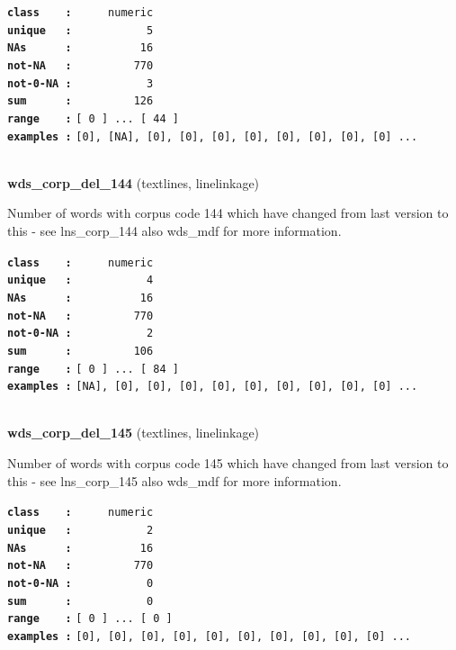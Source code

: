 \documentclass[]{article}
\begin{document}
\textbf{\texttt{class\ \ \ \ :}} \texttt{~~~~~numeric}\\
\textbf{\texttt{unique\ \ \ :}} \texttt{~~~~~~~~~~~5}\\
\textbf{\texttt{NAs\ \ \ \ \ \ :}} \texttt{~~~~~~~~~~16}\\
\textbf{\texttt{not-NA\ \ \ :}} \texttt{~~~~~~~~~770}\\
\textbf{\texttt{not-0-NA\ :}} \texttt{~~~~~~~~~~~3}\\
\textbf{\texttt{sum\ \ \ \ \ \ :}} \texttt{~~~~~~~~~126}\\
\textbf{\texttt{range\ \ \ \ :}}
\texttt{{[}\ 0\ {]}\ ...\ {[}\ 44\ {]}}\\
\textbf{\texttt{examples\ :}}
\texttt{{[}0{]},\ {[}NA{]},\ {[}0{]},\ {[}0{]},\ {[}0{]},\ {[}0{]},\ {[}0{]},\ {[}0{]},\ {[}0{]},\ {[}0{]}\ ...}\\

~

\textbf{wds\_corp\_del\_144} (textlines, linelinkage)

Number of words with corpus code 144 which have changed from last
version to this - see lns\_corp\_144 also wds\_mdf for more information.

\textbf{\texttt{class\ \ \ \ :}} \texttt{~~~~~numeric}\\
\textbf{\texttt{unique\ \ \ :}} \texttt{~~~~~~~~~~~4}\\
\textbf{\texttt{NAs\ \ \ \ \ \ :}} \texttt{~~~~~~~~~~16}\\
\textbf{\texttt{not-NA\ \ \ :}} \texttt{~~~~~~~~~770}\\
\textbf{\texttt{not-0-NA\ :}} \texttt{~~~~~~~~~~~2}\\
\textbf{\texttt{sum\ \ \ \ \ \ :}} \texttt{~~~~~~~~~106}\\
\textbf{\texttt{range\ \ \ \ :}}
\texttt{{[}\ 0\ {]}\ ...\ {[}\ 84\ {]}}\\
\textbf{\texttt{examples\ :}}
\texttt{{[}NA{]},\ {[}0{]},\ {[}0{]},\ {[}0{]},\ {[}0{]},\ {[}0{]},\ {[}0{]},\ {[}0{]},\ {[}0{]},\ {[}0{]}\ ...}\\

~

\textbf{wds\_corp\_del\_145} (textlines, linelinkage)

Number of words with corpus code 145 which have changed from last
version to this - see lns\_corp\_145 also wds\_mdf for more information.

\textbf{\texttt{class\ \ \ \ :}} \texttt{~~~~~numeric}\\
\textbf{\texttt{unique\ \ \ :}} \texttt{~~~~~~~~~~~2}\\
\textbf{\texttt{NAs\ \ \ \ \ \ :}} \texttt{~~~~~~~~~~16}\\
\textbf{\texttt{not-NA\ \ \ :}} \texttt{~~~~~~~~~770}\\
\textbf{\texttt{not-0-NA\ :}} \texttt{~~~~~~~~~~~0}\\
\textbf{\texttt{sum\ \ \ \ \ \ :}} \texttt{~~~~~~~~~~~0}\\
\textbf{\texttt{range\ \ \ \ :}}
\texttt{{[}\ 0\ {]}\ ...\ {[}\ 0\ {]}}\\
\textbf{\texttt{examples\ :}}
\texttt{{[}0{]},\ {[}0{]},\ {[}0{]},\ {[}0{]},\ {[}0{]},\ {[}0{]},\ {[}0{]},\ {[}0{]},\ {[}0{]},\ {[}0{]}\ ...}\\
\end{document}
